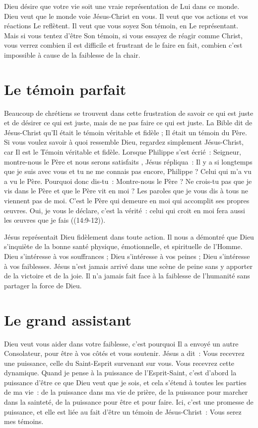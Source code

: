 Dieu désire que votre vie soit une vraie représentation de Lui dans ce monde.
 Dieu veut que le monde voie Jésus-Christ en vous.
 Il veut que vos actions et vos réactions Le reflètent.
 Il veut que vous soyez Son témoin, en Le représentant.
 Mais si vous tentez d'être Son témoin, si vous essayez de réagir comme Christ,
 vous verrez combien il est difficile et frustrant de le faire
 \ocadr en fait, combien c'est impossible à cause de la faiblesse de la chair.

\section*{Le témoin parfait}

Beaucoup de chrétiens se trouvent dans cette frustration de savoir
 ce qui est juste et de désirer ce qui est juste, mais de ne pas faire
 ce qui est juste.
 La Bible dit de Jésus-Christ qu'Il était le témoin véritable et fidèle ;
 Il était un témoin du Père.
 Si vous voulez savoir à quoi ressemble Dieu, regardez simplement
 Jésus-Christ, car Il est le Témoin véritable et fidèle.
 Lorsque Philippe s'est écrié~:
 \og Seigneur, montre-nous le Père et nous serons satisfaits \fg{},
 Jésus répliqua~:
 \og Il y a si longtemps que je suis avec vous et tu ne me connais pas encore,
 Philippe ? Celui qui m'a vu a vu le Père. Pourquoi donc dis-tu~:
 \og Montre-nous le Père \fg{} ?
 Ne crois-tu pas que je vis dans le Père et que le Père vit en moi ?
 Les paroles que je vous dis à tous ne viennent pas de moi.
 C'est le Père qui demeure en moi qui accomplit ses propres œuvres.
 Oui, je vous le déclare, c'est la vérité~:
 celui qui croit en moi fera aussi les œuvres que je fais \fg{}
 ((14:9-12)).

Jésus représentait Dieu fidèlement dans toute action.
 Il nous a démontré que Dieu s'inquiète de la bonne santé physique,
 émotionnelle, et spirituelle de l'Homme.
 Dieu s'intéresse à vos souffrances ; Dieu s'intéresse à vos peines ;
 Dieu s'intéresse à vos faiblesses.
 Jésus n'est jamais arrivé dans une scène de peine sans y apporter
 de la victoire et de la joie. Il n'a jamais fait face à la faiblesse
 de l'humanité sans partager la force de Dieu.

\section*{Le grand assistant}

Dieu veut vous aider dans votre faiblesse,
 c'est pourquoi Il a envoyé un autre Consolateur,
 pour être à vos côtés et vous soutenir. Jésus a dit~:
 \og Vous recevrez une puissance,
 celle du Saint-Esprit survenant sur vous. \fg{}
 Vous recevrez cette dynamique. Quand je pense à la puissance
 de l'Esprit-Saint, c'est d'abord la puissance d'être ce que Dieu
 veut que je sois, et cela s'étend à toutes les parties de ma vie~:
 de la puissance dans ma vie de prière, de la puissance pour marcher
 dans la sainteté, de la puissance pour être et pour faire.
 Ici, c'est une promesse de puissance, et elle est liée au fait
 d'être un témoin de Jésus-Christ~: \og Vous serez mes témoins. \fg{}

